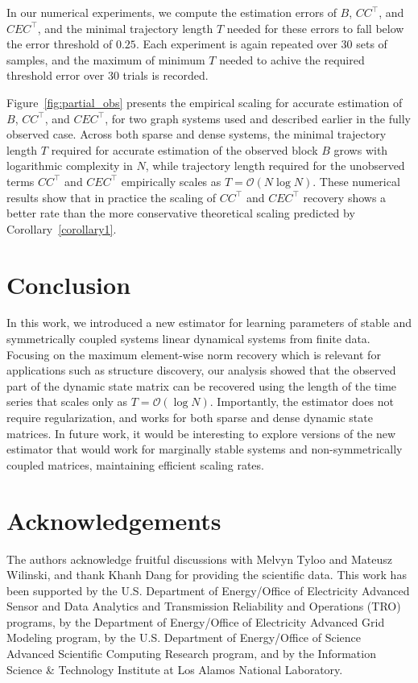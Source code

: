 \documentclass[11pt]{article}
\begin{document}
In our numerical experiments, we compute the estimation errors of $B$, $CC^\top$, and $CEC^\top$, and the minimal trajectory length $T$ needed for these errors to fall below the error threshold of $0.25$. Each experiment is again repeated over 30 sets of samples, and the maximum of minimum $T$ needed to achive the required threshold error over 30 trials is recorded.

Figure~\ref{fig:partial_obs} presents the empirical scaling for accurate estimation of $B$, $CC^\top$, and $CEC^\top$, for two graph systems used and described earlier in the fully observed case. 
Across both sparse and dense systems, the minimal trajectory length $T$ required for accurate estimation of the observed block $B$ grows with logarithmic complexity in $N$, while trajectory length required for the unobserved terms $CC^\top$ and $CEC^\top$ empirically scales as $T = \mathcal{O}(N\log N)$. These numerical results show that in practice the scaling of $CC^\top$ and $CEC^\top$ recovery shows a better rate than the more conservative theoretical scaling predicted by Corollary~\ref{corollary1}.


\section{Conclusion}
In this work, we introduced a new estimator for learning parameters of stable and symmetrically coupled systems linear dynamical systems from finite data. Focusing on the maximum element-wise norm recovery which is relevant for applications such as structure discovery, our analysis showed that the observed part of the dynamic state matrix can be recovered using the length of the time series that scales only as $T = \mathcal{O}(\log N)$. Importantly, the estimator does not require regularization, and works for both sparse and dense dynamic state matrices. In future work, it would be interesting to explore versions of the new estimator that would work for marginally stable systems and non-symmetrically coupled matrices, maintaining efficient scaling rates.

\section*{Acknowledgements}
The authors acknowledge fruitful discussions with Melvyn Tyloo and Mateusz Wilinski, and thank Khanh Dang for providing the scientific data. This work has been supported by the U.S. Department of Energy/Office of Electricity Advanced Sensor and Data Analytics and Transmission Reliability and Operations (TRO) programs, by the Department of Energy/Office of Electricity Advanced Grid Modeling program, by the U.S. Department of Energy/Office of Science Advanced Scientific Computing Research program, and by the Information Science \& Technology Institute at Los Alamos National Laboratory.

% 


\end{document}
